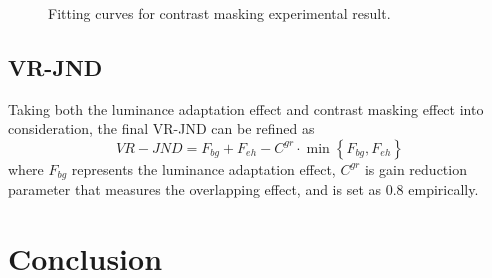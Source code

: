 \documentclass[journal]{IEEEtran}
\begin{document}
\begin{figure}[!t]
	\caption{Fitting curves for contrast masking experimental result.}
	\label{fig:curve_fitting_eh}
\end{figure}
\subsection{VR-JND}
Taking both the luminance adaptation effect and contrast masking effect into consideration, the final VR-JND can be refined as
\begin{equation}
VR-JND= F_{bg}+F_{eh}-C^{gr}\cdot \min \left\{F_{bg}, F_{eh}\right\}
\end{equation}
where $F_{bg}$ represents the luminance adaptation effect, $C^{gr}$ is gain reduction parameter that measures the overlapping effect, and is set as $0.8$ empirically.
\section{Conclusion}


\ifCLASSOPTIONcaptionsoff
  \newpage
\fi

{
	\small
	
	
}
\end{document}
